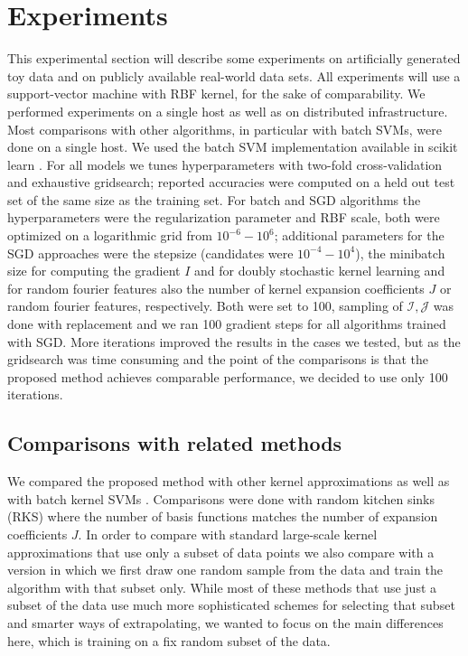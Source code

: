 \documentclass{article} %
\begin{document}
\section{Experiments}
This experimental section will describe some experiments on artificially generated toy data and on publicly available real-world data sets. All experiments will use a support-vector machine with RBF kernel, for the sake of comparability. We performed experiments on a single host as well as on distributed infrastructure. Most comparisons with other algorithms, in particular with batch SVMs, were done on a single host. We used the batch SVM implementation available in scikit learn \cite{sklearn_api}. For all models we tunes hyperparameters with two-fold cross-validation and exhaustive gridsearch; reported accuracies were computed on a held out test set of the same size as the training set. For batch and SGD algorithms the hyperparameters were the regularization parameter and RBF scale, both were optimized on a logarithmic grid from $10^{-6}-10^6$; additional parameters for the SGD approaches were the stepsize (candidates were $10^{-4}-10^4$), the minibatch size for computing the gradient $I$ and for doubly stochastic kernel learning and for random fourier features also the number of kernel expansion coefficients $J$ or random fourier features, respectively. Both were set to 100, sampling of $\mathcal{I,J}$ was done with replacement and we ran 100 gradient steps for all algorithms trained with SGD. More iterations improved the results in the cases we tested, but as the gridsearch was time consuming and the point of the comparisons is that the proposed method achieves comparable performance, we decided to use only 100 iterations. 

\subsection{Comparisons with related methods}
We compared the proposed method with other kernel approximations as well as with batch kernel SVMs . Comparisons were done with random kitchen sinks (RKS) where the number of basis functions matches the number of expansion coefficients $J$. In order to compare with standard large-scale kernel approximations that use only a subset of data points we also compare with a version in which we first draw one random sample from the data and train the algorithm with that subset only. While most of these methods that use just a subset of the data use much more sophisticated schemes for selecting that subset and smarter ways of extrapolating, we wanted to focus on the main differences here, which is training on a fix random subset of the data. 
\end{document}
